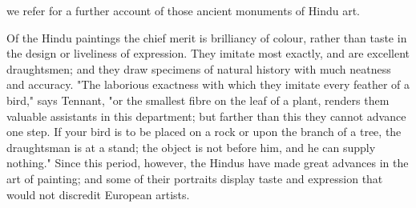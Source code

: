 \documentclass{article}
\begin{document}
we refer for a further account of those ancient monuments of Hindu art.

Of the Hindu paintings the chief merit is brilliancy of colour, rather than taste in the design or liveliness of expression. They imitate most exactly, and are excellent draughtsmen; and they draw specimens of natural history with much neatness and accuracy. "The laborious exactness with which they imitate every feather of a bird," says Tennant, "or the smallest fibre on the leaf of a plant, renders them valuable assistants in this department; but farther than this they cannot advance one step. If your bird is to be placed on a rock or upon the branch of a tree, the draughtsman is at a stand; the object is not before him, and he can supply nothing." Since this period, however, the Hindus have made great advances in the art of painting; and some of their portraits display taste and expression that would not discredit European artists.
\end{document}
